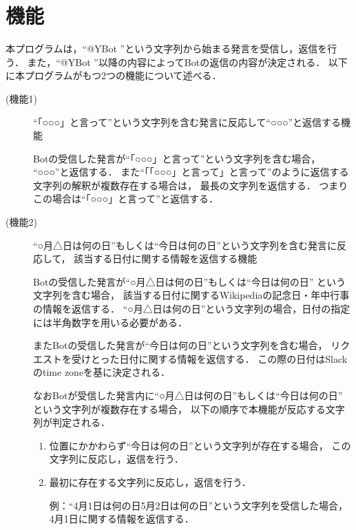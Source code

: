 \documentclass[fleqn, 14pt]{extarticlej}
\begin{document}
\section{機能}
\label{sec:function}
本プログラムは，``@YBot ''という文字列から始まる発言を受信し，返信を行う．
また，``@YBot ''以降の内容によってBotの返信の内容が決定される．
以下に本プログラムがもつ2つの機能について述べる．
\begin{description}
\item[(機能1)]\label{item:function1}
  ``「○○○」と言って''という文字列を含む発言に反応して``○○○''と返信する機能
  
  Botの受信した発言が``「○○○」と言って''という文字列を含む場合，
  ``○○○''と返信する．
  また``「「○○○」と言って」と言って''のように返信する文字列の解釈が複数存在する場合は，
  最長の文字列を返信する．
  つまりこの場合は``「○○○」と言って''と返信する．
  
  
\item[(機能2)]\label{item:function2}
  ``○月△日は何の日''もしくは``今日は何の日''という文字列を含む発言に反応して，
  該当する日付に関する情報を返信する機能

  Botの受信した発言が``○月△日は何の日''もしくは``今日は何の日''
  という文字列を含む場合，
  該当する日付に関するWikipediaの記念日・年中行事の情報を返信する．
  ``○月△日は何の日''という文字列の場合，日付の指定には半角数字を用いる必要がある．
  
  
  またBotの受信した発言が``今日は何の日''という文字列を含む場合，
  リクエストを受けとった日付に関する情報を返信する．
  この際の日付はSlackのtime zoneを基に決定される．
  
  なおBotが受信した発言内に``○月△日は何の日''もしくは``今日は何の日''
  という文字列が複数存在する場合，
  以下の順序で本機能が反応する文字列が判定される．
  \begin{enumerate}
  \item{}
    位置にかかわらず``今日は何の日''という文字列が存在する場合，
    この文字列に反応し，返信を行う．
    
  \item{}
    最初に存在する文字列に反応し，返信を行う．
    
    例：``4月1日は何の日5月2日は何の日''という文字列を受信した場合，
    4月1日に関する情報を返信する．     
  \end{enumerate}


\end{description}
\end{document}
